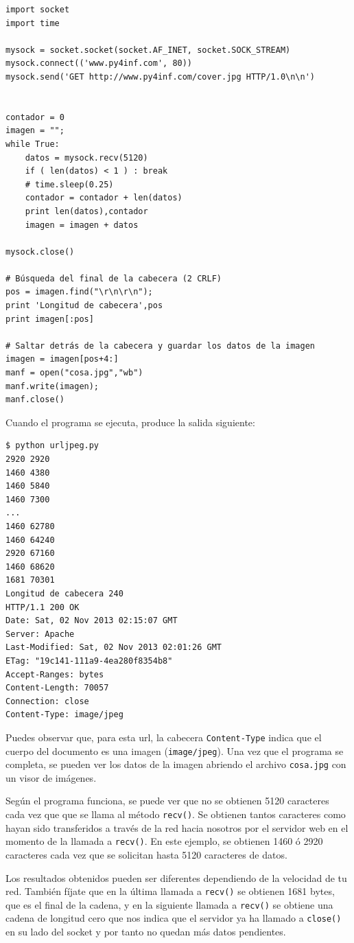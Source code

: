 \beforeverb
\begin{verbatim}
import socket
import time

mysock = socket.socket(socket.AF_INET, socket.SOCK_STREAM)
mysock.connect(('www.py4inf.com', 80))
mysock.send('GET http://www.py4inf.com/cover.jpg HTTP/1.0\n\n')


contador = 0
imagen = "";
while True:
    datos = mysock.recv(5120)
    if ( len(datos) < 1 ) : break
    # time.sleep(0.25)
    contador = contador + len(datos)
    print len(datos),contador
    imagen = imagen + datos

mysock.close()

# Búsqueda del final de la cabecera (2 CRLF)
pos = imagen.find("\r\n\r\n");
print 'Longitud de cabecera',pos
print imagen[:pos]

# Saltar detrás de la cabecera y guardar los datos de la imagen
imagen = imagen[pos+4:]
manf = open("cosa.jpg","wb")
manf.write(imagen);
manf.close()
\end{verbatim}
\afterverb
%
Cuando el programa se ejecuta, produce la salida siguiente:

\beforeverb
\begin{verbatim}
$ python urljpeg.py 
2920 2920
1460 4380
1460 5840
1460 7300
...
1460 62780
1460 64240
2920 67160
1460 68620
1681 70301
Longitud de cabecera 240
HTTP/1.1 200 OK
Date: Sat, 02 Nov 2013 02:15:07 GMT
Server: Apache
Last-Modified: Sat, 02 Nov 2013 02:01:26 GMT
ETag: "19c141-111a9-4ea280f8354b8"
Accept-Ranges: bytes
Content-Length: 70057
Connection: close
Content-Type: image/jpeg
\end{verbatim}
\afterverb
%
Puedes observar que, para esta url, la
cabecera {\tt Content-Type} indica que el
cuerpo del documento es una imagen ({\tt image/jpeg}).
Una vez que el programa se completa, se pueden ver los datos de la imagen abriendo
el archivo {\tt cosa.jpg} con un visor de imágenes.

Según el programa funciona, se puede ver que no se obtienen 5120 caracteres
cada vez que que se llama al método {\tt recv()}.
Se obtienen tantos caracteres como hayan sido transferidos a través de la red
hacia nosotros por el servidor web en el momento de la llamada a {\tt recv()}.
En este ejemplo, se obtienen 1460 ó 2920 caracteres cada vez que
se solicitan hasta 5120 caracteres de datos.

Los resultados obtenidos pueden ser diferentes dependiendo de la velocidad de tu red. También
fíjate que en la última llamada a {\tt recv()} se obtienen 1681 bytes, que es el final
de la cadena, y en la siguiente llamada a {\tt recv()} se obtiene una cadena de
longitud cero que nos indica que el servidor ya ha llamado a {\tt close()} en su lado
del socket y por tanto no quedan más datos pendientes.

